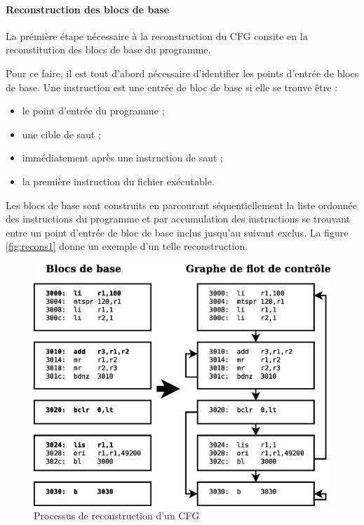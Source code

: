       \paragraph{Reconstruction des blocs de base}
      { La prémière étape nécessaire à la reconstruction du CFG consite en la
        reconstitution des blocs de base du programme.

        Pour ce faire, il est tout d'abord nécessaire d'identifier les points
        d'entrée de blocs de base. Une instruction est une entrée de bloc de base
        si elle se trouve être :
        \begin{itemize}
          \item le point d'entrée du programme ;
          \item une cible de saut ;
          \item immédiatement après une instruction de saut ;
          \item la première instruction du fichier exécutable.
        \end{itemize}

        Les blocs de base sont construits en parcourant séquentiellement la
        liste ordonnée des instructions du programme et par accumulation des
        instructions se trouvant entre un point d'entrée de bloc de base inclus
        jusqu'au suivant exclus. La figure \ref{fig:recons1} donne un exemple
        d'un telle reconstruction. }

      \begin{figure}
        \centering
        \includegraphics[scale=0.3]{recons2.eps}
        \caption{Processus de reconstruction d'un CFG}
        \label{fig:recons2}
      \end{figure}

